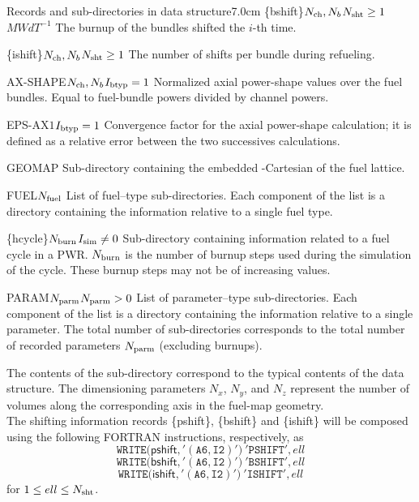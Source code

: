 \begin{DescriptionEnregistrement}{Records and sub-directories
 in  data structure}{7.0cm}
\OptRealVar
 {\{bshift\}}{$N_{\rm ch}, N_b$}{$N_{\rm sht} \ge 1$}{$MW d T^{-1}$}
 {The burnup of the bundles shifted the $i$-th time.}
            
\OptIntVar
 {\{ishift\}}{$N_{\rm ch},N_b$}{$N_{\rm sht} \ge 1$}
 {The number of  shifts per bundle during refueling.}

\OptRealEnr
 {AX-SHAPE}{$N_{\rm ch}, N_b$}{$I_{\rm btyp}=1$}{}
 {Normalized axial power-shape values over the fuel bundles. Equal to
 fuel-bundle powers divided by channel powers.}

\OptRealEnr
 {EPS-AX}{$1$}{$I_{\rm btyp}=1$}{}
 {Convergence factor for the axial power-shape calculation; it is
  defined as a relative error between the two successives calculations.}
          
\DirEnr
 {GEOMAP}
 {Sub-directory containing the embedded -Cartesian  of the fuel lattice.}

\DirlEnr
  {FUEL}{$N_{\rm fuel}$}
  {List of fuel--type sub-directories. Each component of the list is a directory containing
   the information relative to a single fuel type.}
          
\OptDirlEnr
 {\{hcycle\}}{$N_{\rm burn}$}{$I_{\rm sim}\ne 0$}
 {Sub-directory containing information related to a fuel cycle in a PWR. $N_{\rm burn}$ is the number of burnup steps used during
 the simulation of the cycle. These burnup steps may not be of increasing values.}

\OptDirlEnr
  {PARAM}{$N_{\rm parm}$}{$N_{\rm parm}>0$}
  {List of parameter--type sub-directories. Each component of the list is a directory
   containing the information relative to a single parameter. The total number of sub-directories
   corresponds to the total number of recorded parameters $N_{\rm parm}$ (excluding  burnups).}

\end{DescriptionEnregistrement}

\noindent
The contents of the  sub-directory correspond to the typical
contents of the  data structure.
The dimensioning parameters $N_x$, $N_y$, and $N_z$ represent the number
of volumes along the corresponding axis in the fuel-map geometry.\\

The shifting information records \{pshift\}, \{bshift\} and \{ishift\}
will be composed using the following FORTRAN instructions, respectively, as 
  \begin{displaymath}
    \mathtt{WRITE(}\mathsf{pshift}\mathtt{,'(A6,I2)')} \ 
   \mathtt{'PSHIFT'},ell
  \end{displaymath}
  \begin{displaymath}
    \mathtt{WRITE(}\mathsf{bshift}\mathtt{,'(A6,I2)')} \ 
   \mathtt{'BSHIFT'},ell
  \end{displaymath}
  \begin{displaymath}
    \mathtt{WRITE(}\mathsf{ishift}\mathtt{,'(A6,I2)')} \ 
   \mathtt{'ISHIFT'},ell
  \end{displaymath}
for $1\leq ell \leq N_{\rm sht}$. \\

